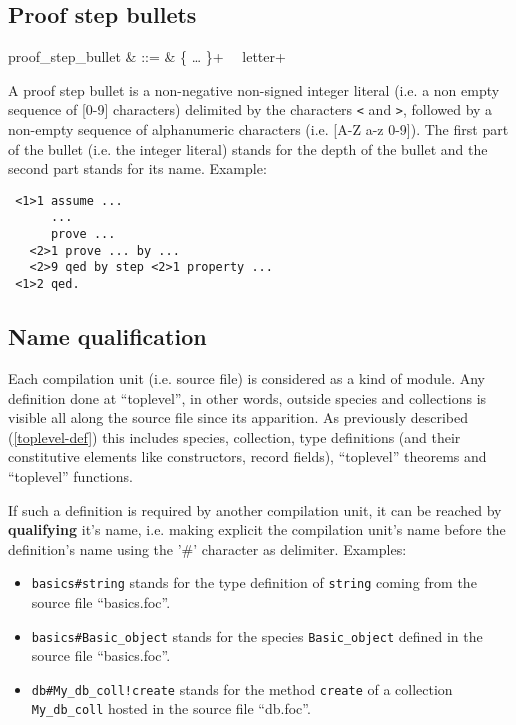 \subsection{Proof step bullets}
\begin{syntax}
proof\_step\_bullet & ::= &
   \terminal{<} \{  \ldots {} \}+\ \terminal{>}
   \ letter+
\end{syntax}

A proof step bullet is a non-negative non-signed integer literal
(i.e. a non empty sequence of [0-9] characters) delimited by the
characters {\tt <} and {\tt >}, followed by a non-empty sequence of
alphanumeric characters (i.e. [A-Z a-z 0-9]). 
The first part of the bullet (i.e. the integer literal) stands for the
depth of the bullet and the second part stands for its name. Example:
{\scriptsize
\begin{lstlisting}
 <1>1 assume ...
      ...
      prove ...
   <2>1 prove ... by ...
   <2>9 qed by step <2>1 property ...
 <1>2 qed.
\end{lstlisting}
}



\subsection{Name qualification}
\label{qualified-name}
Each compilation unit (i.e. source file) is considered as a kind of
module. Any definition done at ``toplevel'', in other words, outside
species and collections is visible all along the source file since its
apparition. As previously described (\ref{toplevel-def}) this includes
species, collection, type definitions (and their constitutive elements
like constructors, record fields), ``toplevel'' theorems and
``toplevel'' functions.

If such a definition is required by another compilation unit, it can
be reached by {\bf qualifying} it's name, i.e. making explicit the
compilation unit's name before the definition's name using the '\#'
character as delimiter. Examples:

\begin{itemize}
  \item {\tt basics\#string} stands for the type definition of
    {\tt string} coming from the source file ``basics.foc''.
  \item {\tt  basics\#Basic\_object} stands for the species
    {\tt Basic\_object} defined in the source file ``basics.foc''.
  \item {\tt db\#My\_db\_coll!create} stands for the method
    {\tt create} of a collection {\tt My\_db\_coll} hosted in the
    source file ``db.foc''.
\end{itemize}

